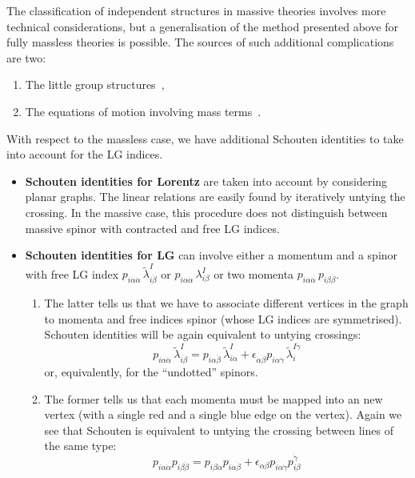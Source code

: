 \documentclass[aps,prd,nofootinbib,twocolumn,10pt]{revtex4-2}
\begin{document}
The classification of independent structures in massive theories involves more technical considerations, but a generalisation of the method presented above for fully massless theories is possible. The sources of such additional complications are two:
\begin{enumerate}
	\item The little group structures\ ,
	\item The equations of motion involving mass terms\ .
\end{enumerate}
With respect to the massless case, we have additional Schouten identities to take into account for the LG indices.
\begin{itemize}
	\item \textbf{Schouten identities for Lorentz} are taken into account by considering planar graphs. The linear relations are easily found by iteratively untying the crossing. In the massive case, this procedure does not distinguish between massive spinor with contracted and free LG indices.
	\item \textbf{Schouten identities for LG} can involve either a momentum and a spinor with free LG index $p_{i \alpha \dot{\alpha}}\, \widetilde{\lambda}^I_{i \dot{\beta}}$ or $p_{i \alpha \dot{\alpha}}\, \lambda^I_{i \beta}$ or two momenta $p_{i \alpha \dot{\alpha}}\, p_{i \beta \dot{\beta}}$.
	\begin{enumerate}
		\item The latter tells us that we have to associate different vertices in the graph to momenta and free indices spinor (whose LG indices are symmetrised). Schouten identities will be again equivalent to untying crossings:
		\begin{equation}
			p_{i \alpha \dot{\alpha}}\, \widetilde{\lambda}^I_{i \dot{\beta}} = p_{i \alpha \dot{\beta}}\, \widetilde{\lambda}^I_{i \dot{\alpha}} + \epsilon_{\dot{\alpha} \dot{\beta}} p_{i \alpha \dot{\gamma}}\, \widetilde{\lambda}^{I \dot{\gamma}}_{i}
		\end{equation}
		or, equivalently, for the “undotted” spinors.
		\item The former tells us that each momenta must be mapped into an new vertex (with a single red and a single blue edge on the vertex). Again we see that Schouten is equivalent to untying the crossing between lines of the same type:
		\begin{equation}
			p_{i \alpha \dot{\alpha}} p_{i \beta \dot{\beta}} = p_{i \beta \dot{\alpha}} p_{i \alpha \dot{\beta}} + \epsilon_{\alpha \beta} p_{i \alpha \dot{\gamma}} p_{i \beta}^{\dot{\gamma}}

\end{equation}
\end{enumerate}
\end{itemize}
\end{document}
